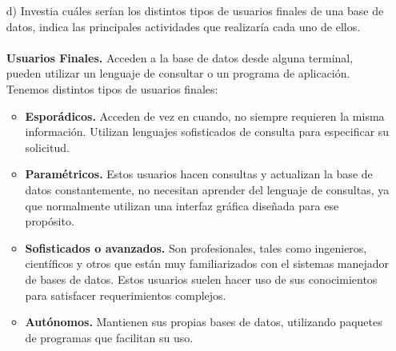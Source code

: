 \documentclass[a4paper, 12pt]{report}
\begin{document}
\begin{enumerate}
{\begin{enumerate}
\begin{itemize}
    	El diseñador debe indentificar las ideas de prueba que se deben explorar para valorar la calidad aceptable de los elementos de prueba de destino como tambien identificar un número suficiente de ideas para validar de forma adecuada elementos de prueba de destino con motivadores de prueba.
    	\item Implementar elementos de diseño:\\
    	El diseñador debe producir una implementación para una parte del diseño (por ejemplo, una clase, una realización de guión de uso o una entidad de base de datos), o para solucionar uno o varios defectos.
    	\item  Revisar el diseño:\\
    	El diseñador debe verificar que el modelo de diseño cumple los requisitos del sistema y que es una buena base para su implementación, garantizar que el modelo de diseño es coherente con las directrices de diseño generales y que las directrices de diseño cumplen sus objetivos.


    \end{itemize}

    \item[d)] Investia  cuáles  serían  los distintos tipos de
     usuarios finales de una base de datos, indica las principales
     actividades que realizaría cada uno de ellos. \\\\
     \textbf{Usuarios Finales.} Acceden a la base de datos desde
     alguna terminal, pueden utilizar un lenguaje de consultar o un
     programa de aplicación. Tenemos distintos tipos de usuarios
     finales:
     \begin{itemize}
       \item \textbf{Esporádicos.} Acceden de vez en cuando, no
       siempre requieren la misma información. Utilizan lenguajes
       sofisticados de consulta para especificar su solicitud.\\
       \item \textbf{Paramétricos.} Estos usuarios hacen consultas
       y actualizan la base de datos constantemente, no necesitan
       aprender del lenguaje de consultas, ya que normalmente
       utilizan una interfaz gráfica diseñada para ese propósito.
       \item \textbf{Sofisticados o avanzados.} Son profesionales,
       tales como ingenieros, científicos y otros que están muy
       familiarizados con el sistemas manejador de bases de datos.
       Estos usuarios suelen hacer uso de sus conocimientos para
       satisfacer requerimientos complejos.
       \item \textbf{Autónomos.} Mantienen sus propias bases de datos, utilizando paquetes de programas que facilitan su uso.


\end{itemize}
\end{enumerate}}
\end{enumerate}
\end{document}
